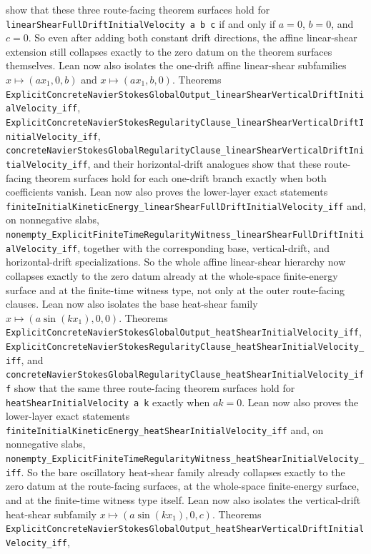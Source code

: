 \documentclass[11pt]{article}
\begin{document}
show that these three route-facing theorem surfaces hold for
\texttt{linearShearFullDriftInitialVelocity a b c} if and only if
\(a = 0\), \(b = 0\), and \(c = 0\).  So even after adding both constant drift
directions, the affine linear-shear extension still collapses exactly to the
zero datum on the theorem surfaces themselves.
Lean now also isolates the one-drift affine linear-shear subfamilies
\(x \mapsto (a x_1, 0, b)\) and \(x \mapsto (a x_1, b, 0)\).  Theorems
\texttt{ExplicitConcreteNavierStokesGlobalOutput\_linearShearVerticalDriftInitialVelocity\_iff},
\texttt{ExplicitConcreteNavierStokesRegularityClause\_linearShearVerticalDriftInitialVelocity\_iff},
\texttt{concreteNavierStokesGlobalRegularityClause\_linearShearVerticalDriftInitialVelocity\_iff},
and their horizontal-drift analogues show that these route-facing theorem
surfaces hold for each one-drift branch exactly when both coefficients vanish.
Lean now also proves the lower-layer exact statements
\texttt{finiteInitialKineticEnergy\_linearShearFullDriftInitialVelocity\_iff}
and, on nonnegative slabs,
\texttt{nonempty\_ExplicitFiniteTimeRegularityWitness\_linearShearFullDriftInitialVelocity\_iff},
together with the corresponding base, vertical-drift, and horizontal-drift
specializations.  So the whole affine linear-shear hierarchy now collapses
exactly to the zero datum already at the whole-space finite-energy surface and
at the finite-time witness type, not only at the outer route-facing clauses.
Lean now also isolates the base heat-shear family
\(x \mapsto (a \sin(k x_1), 0, 0)\).  Theorems
\texttt{ExplicitConcreteNavierStokesGlobalOutput\_heatShearInitialVelocity\_iff},
\texttt{ExplicitConcreteNavierStokesRegularityClause\_heatShearInitialVelocity\_iff},
and
\texttt{concreteNavierStokesGlobalRegularityClause\_heatShearInitialVelocity\_iff}
show that the same three route-facing theorem surfaces hold for
\texttt{heatShearInitialVelocity a k} exactly when \(a k = 0\).  Lean now also
proves the lower-layer exact statements
\texttt{finiteInitialKineticEnergy\_heatShearInitialVelocity\_iff}
and, on nonnegative slabs,
\texttt{nonempty\_ExplicitFiniteTimeRegularityWitness\_heatShearInitialVelocity\_iff}.
So the bare oscillatory heat-shear family already collapses exactly to the zero
datum at the route-facing surfaces, at the whole-space finite-energy surface,
and at the finite-time witness type itself.
Lean now also isolates the vertical-drift heat-shear subfamily
\(x \mapsto (a \sin(k x_1), 0, c)\).  Theorems
\texttt{ExplicitConcreteNavierStokesGlobalOutput\_heatShearVerticalDriftInitialVelocity\_iff},
\end{document}
